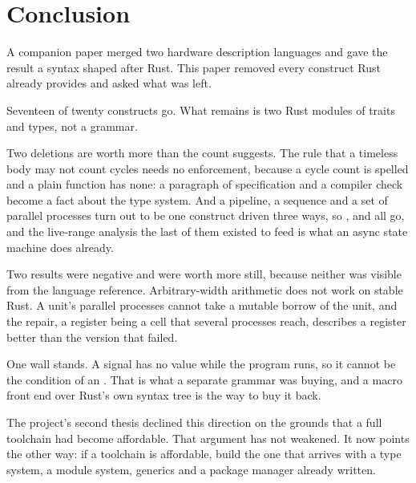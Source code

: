 \section{Conclusion}
\label{sec:e-conclusion}

A companion paper merged two hardware description languages and gave the
result a syntax shaped after Rust. This paper removed every construct Rust
already provides and asked what was left.

Seventeen of twenty constructs go. What remains is two Rust modules of
traits and types, not a grammar.

Two deletions are worth more than the count suggests. The rule that a
timeless body may not count cycles needs no enforcement, because a cycle
count is spelled  and a plain function has none: a paragraph
of specification and a compiler check become a fact about the type system.
And a pipeline, a sequence and a set of parallel processes turn out to be
one construct driven three ways, so ,  and
 all go, and the live-range analysis the last of them existed to
feed is what an async state machine does already.

Two results were negative and were worth more still, because neither was
visible from the language reference. Arbitrary-width arithmetic does not
work on stable Rust. A unit's parallel processes cannot take a mutable
borrow of the unit, and the repair, a register being a cell that several
processes reach, describes a register better than the version that failed.

One wall stands. A signal has no value while the program runs, so it cannot
be the condition of an . That is what a separate grammar was
buying, and a macro front end over Rust's own syntax tree is the way to buy
it back.

The project's second thesis declined this direction on the grounds that a
full toolchain had become affordable. That argument has not weakened. It
now points the other way: if a toolchain is affordable, build the one that
arrives with a type system, a module system, generics and a package manager
already written.
